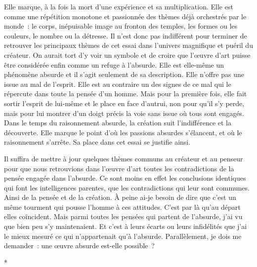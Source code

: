 \documentclass{book}
\begin{document}
Elle marque, à la fois la mort d'une expérience et sa multiplication. Elle est comme une répétition monotone et passionnée des thèmes déjà orchestrés par le monde : le corps, inépuisable image au fronton des temples, les formes ou les couleurs, le nombre ou la détresse. Il n'est donc pas indifférent pour terminer de retrouver les principaux thèmes de cet essai dans l'univers magnifique et puéril du créateur. On aurait tort d'y voir un symbole et de croire que l'œuvre d'art puisse être considérée enfin comme un refuge à l'absurde. Elle est elle‑même un phénomène absurde et il s'agit seulement de sa description. Elle n'offre pas une issue au mal de l'esprit. Elle est au contraire un des signes de ce mal qui le répercute dans toute la pensée d'un homme. Mais pour la première fois, elle fait sortir l'esprit de lui‑même et le place en face d'autrui, non pour qu'il s'y perde, mais pour lui montrer d'un doigt précis la voie sans issue où tous sont engagés. Dans le temps du raisonnement absurde, la création suit l'indifférence et la découverte. Elle marque le point d'où les passions absurdes s'élancent, et où le raisonnement s'arrête. Sa place dans cet essai se justifie ainsi.

Il suffira de mettre à jour quelques thèmes communs au créateur et au penseur pour que nous retrouvions dans l'œuvre d'art toutes les contradictions de la pensée engagée dans l'absurde. Ce sont moins en effet les conclusions identiques qui font les intelligences parentes, que les contradictions qui leur sont communes. Ainsi de la pensée et de la création. À peine ai-je besoin de dire que c'est un même tourment qui pousse l'homme à ces attitudes. C'est par là qu'au départ elles coïncident. Mais parmi toutes les pensées qui partent de l'absurde, j'ai vu que bien peu s'y maintenaient. Et c'est à leurs écarts ou leurs infidélités que j'ai le mieux mesuré ce qui n'appartenait qu’à l'absurde. Parallèlement, je dois me demander : une œuvre absurde est-elle possible ?

\begin{center}
*
\end{center}
\end{document}
